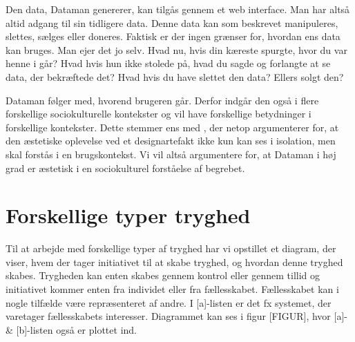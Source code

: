 Den data, Dataman genererer, kan tilgås gennem et web interface. Man har altså altid adgang til sin tidligere data. Denne data kan som beskrevet manipuleres, slettes, sælges eller doneres. Faktisk er der ingen grænser for, hvordan ens data kan bruges. Man ejer det jo selv. Hvad nu, hvis din kæreste spurgte, hvor du var henne i går? Hvad hvis hun ikke stolede på, hvad du sagde og forlangte at se data, der bekræftede det? Hvad hvis du have slettet den data? Ellers solgt den?

Dataman følger med, hvorend brugeren går. Derfor indgår den også i flere forskellige sociokulturelle kontekster og vil have forskellige betydninger i forskellige kontekster. Dette stemmer ens med \cite[]{Petersen:2004:AIP:1013115.1013153}, der netop argumenterer for, at den æstetiske oplevelse ved et designartefakt ikke kun kan ses i isolation, men skal forstås i en brugskontekst. Vi vil altså argumentere for, at Dataman i høj grad er æstetisk i en sociokulturel forståelse af begrebet.



\section*{Forskellige typer tryghed}
Til at arbejde med forskellige typer af tryghed har vi opstillet et diagram, der viser, hvem der tager initiativet til at skabe tryghed, og hvordan denne tryghed skabes. Trygheden kan enten skabes gennem kontrol eller gennem tillid og initiativet kommer enten fra individet eller fra fællesskabet. Fællesskabet kan i nogle tilfælde være repræsenteret af andre. I [a]-listen er det fx systemet, der varetager fællesskabets interesser. Diagrammet kan ses i figur [FIGUR], hvor [a]- \& [b]-listen også er plottet ind. 
    


\begin{comment}
 


\end{comment}